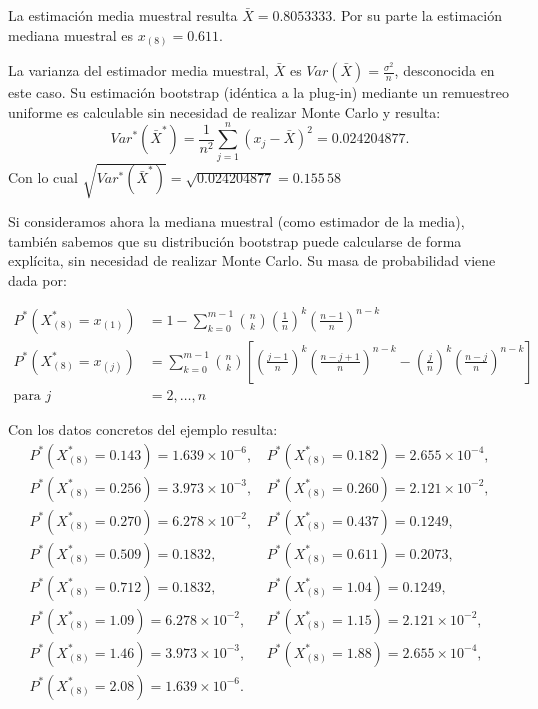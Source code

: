 \documentclass[]{book}
\theoremstyle{definition}
\theoremstyle{definition}
\theoremstyle{definition}
\theoremstyle{remark}
\begin{document}
La estimación media muestral resulta \(\bar{X}=0.8053333\). Por su parte
la estimación mediana muestral es \(x_{\left( 8 \right)}=0.611\).

La varianza del estimador media muestral, \(\bar{X}\) es
\(Var\left( \bar{X} \right) =\frac{\sigma^2}{n}\), desconocida en este
caso. Su estimación bootstrap (idéntica a la plug-in) mediante un
remuestreo uniforme es calculable sin necesidad de realizar Monte Carlo
y resulta: \[Var^{\ast}\left( \bar{X}^{\ast} \right) =\frac{1}{n^2}
\sum_{j=1}^{n}\left( x_j-\bar{X} \right)^2=0.024204877.\] Con lo cual
\(\sqrt{Var^{\ast}\left( \bar{X}^{\ast} \right)}=\sqrt{ 0.024204877}= 0.155\,58\)

Si consideramos ahora la mediana muestral (como estimador de la media),
también sabemos que su distribución bootstrap puede calcularse de forma
explícita, sin necesidad de realizar Monte Carlo. Su masa de
probabilidad viene dada por:

\[\begin{aligned}
P^{\ast}\left( X_{\left( 8 \right)}^{\ast}=x_{(1)} \right)
&= 1-\sum_{k=0}^{m-1}\binom{n}{k}\left( \frac{1}{n} \right)^{k}\left( \frac{
n-1}{n} \right)^{n-k} \\
P^{\ast}\left( X_{\left( 8 \right)}^{\ast}=x_{(j)} \right)
&= \sum_{k=0}^{m-1}\binom{n}{k}\left[ \left( \frac{j-1}{n} \right)^{k}\left( 
\frac{n-j+1}{n} \right)^{n-k} - \left( \frac{j}{n} \right)^{k}\left( \frac{n-j}{n} \right)^{n-k}
\right] \\
\text{para }j &= 2,\ldots ,n
\end{aligned}\]

Con los datos concretos del ejemplo resulta: \[\begin{array}{ll}
P^{\ast}\left( X_{\left( 8 \right)}^{\ast} = 0.143 \right) = 1.639\times 10^{-6}\text{, } 
& P^{\ast}\left( X_{\left( 8 \right)}^{\ast} = 0.182 \right) = 2.655\times 10^{-4},\\
P^{\ast}\left( X_{\left( 8 \right)}^{\ast} = 0.256 \right) = 3.973\times 10^{-3}\text{, } 
& P^{\ast}\left( X_{\left( 8 \right)}^{\ast} = 0.260 \right) = 2.121\times 10^{-2}, \\
P^{\ast}\left( X_{\left( 8 \right)}^{\ast} = 0.270 \right) = 6.278\times 10^{-2}\text{, }
& P^{\ast}\left( X_{\left( 8 \right)}^{\ast} = 0.437 \right) = 0.1249, \\
P^{\ast}\left( X_{\left( 8 \right)}^{\ast} = 0.509 \right) = 0.1832\text{, }
& P^{\ast}\left( X_{\left( 8 \right)}^{\ast} = 0.611 \right) = 0.2073,\\
P^{\ast}\left( X_{\left( 8 \right)}^{\ast} = 0.712 \right) = 0.1832\text{, }
& P^{\ast}\left( X_{\left( 8 \right)}^{\ast} = 1.04 \right) = 0.1249,\\
P^{\ast}\left( X_{\left( 8 \right)}^{\ast} = 1.09 \right) = 6.278\times 10^{-2}\text{, }
& P^{\ast}\left( X_{\left( 8 \right)}^{\ast} = 1.15 \right) = 2.121\times 10^{-2}, \\
P^{\ast}\left( X_{\left( 8 \right)}^{\ast} = 1.46 \right) = 3.973\times 10^{-3}\text{, }
& P^{\ast}\left( X_{\left( 8 \right)}^{\ast} = 1.88 \right) = 2.655\times 10^{-4}, \\
P^{\ast}\left( X_{\left( 8 \right)}^{\ast} = 2.08 \right) = 1.639\times 10^{-6}. 
\end{array}\]
\end{document}
